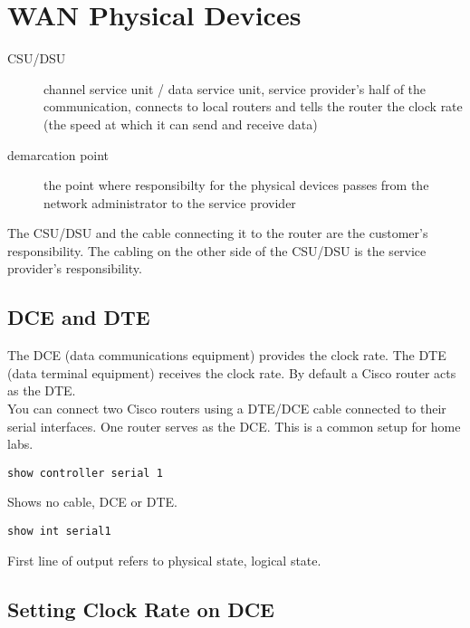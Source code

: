\documentclass{article}
\begin{document}
\section{WAN Physical Devices}

\begin{description}

\item[CSU/DSU]
channel service unit / data service unit, service provider's half of the
communication, connects to local routers and tells the router the clock rate
(the speed at which it can send and receive data)

\item[demarcation point]
the point where responsibilty for the physical devices passes from the
network administrator to the service provider
\end{description}

The CSU/DSU and the cable connecting it to the router are the customer's
responsibility. The cabling on the other side of the CSU/DSU is the service
provider's responsibility.

\subsection{DCE and DTE}

The DCE (data communications equipment) provides the clock rate. The DTE
(data terminal equipment) receives the clock rate. By default a Cisco
router acts as the DTE.\\

You can connect two Cisco routers using a DTE/DCE cable connected to their
serial interfaces. One router serves as the DCE. This is a common setup
for home labs.\\

\begin{verbatim}
show controller serial 1  
\end{verbatim}

Shows no cable, DCE or DTE.\\

\begin{verbatim}
show int serial1
\end{verbatim}

First line of output refers to physical state, logical state.

\subsection{Setting Clock Rate on DCE}
\end{document}
